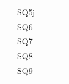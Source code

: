 \documentclass[]{book}
\begin{document}
\begin{table}[ht]
\begin{tabular}{|l|l|l|p{3cm}|p{5cm}|}
        & SQ5j                                  &                                    &                                                         &                                                                                                                 \\ \cline{2-2}
        & SQ6                                   &                                    &                                                         &                                                                                                                 \\ \cline{2-2}
        & SQ7                                   &                                    &                                                         &                                                                                                                 \\ \cline{2-2}
        & SQ8                                   &                                    &                                                         &                                                                                                                 \\ \cline{2-2}
        & SQ9                                   &                                    &                                                         &                                                                                                                 \\ \hline
    \end{tabular}
\end{table}
\end{document}
